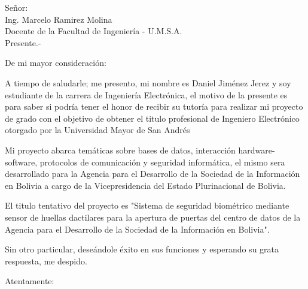\documentclass[12pt, letterpaper]{letter}
\begin{document}
	\begin{letter}{Señor:\\Ing. Marcelo Ramirez Molina\\Docente de la Facultad de Ingeniería - U.M.S.A.\\Presente.-}		
		\opening{ \vspace{2em}
		De mi mayor consideración:}
		A tiempo de saludarle; me presento, mi nombre es Daniel Jiménez Jerez y soy estudiante de la carrera de Ingeniería Electrónica, el motivo de la presente es para saber si podría tener el honor de recibir su tutoría para realizar mi proyecto de grado con el objetivo de obtener el titulo profesional de Ingeniero Electrónico otorgado por la Universidad Mayor de San Andrés
		
		Mi proyecto abarca temáticas sobre bases de datos, interacción hardware-software,  protocolos de comunicación y seguridad informática, el mismo sera desarrollado para la Agencia para el Desarrollo de la Sociedad de la Información en Bolivia a cargo de la Vicepresidencia del Estado Plurinacional de Bolivia.
		
		El titulo tentativo del proyecto es "Sistema de seguridad biométrico mediante sensor de huellas dactilares para la apertura de puertas del centro de datos de la Agencia para el Desarrollo de la Sociedad de la Información en Bolivia".
		
		Sin otro particular, deseándole éxito en sus funciones y esperando su grata respuesta, me despido.
		
		\closing{\hspace{-0cm}Atentamente:}
	\end{letter}
\end{document}
